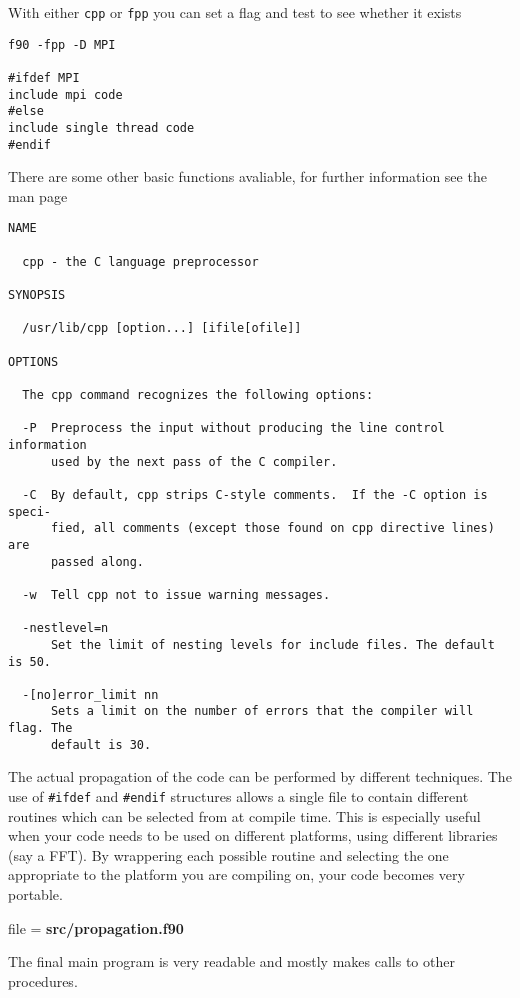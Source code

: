\documentclass[12pt,a4paper,oneside,openany]{report}
\newcommand{\fcode}[1]{\par \small file = \textbf{#1}  \normalsize}
\newcommand{\code}[1]{\texttt{#1}}
\begin{document}
With either \code{cpp} or \code{fpp} you can set a flag and test to see whether it exists

\begin{verbatim}
f90 -fpp -D MPI

#ifdef MPI
include mpi code
#else
include single thread code
#endif
\end{verbatim}

\newpage

There are some other basic functions avaliable, for further information see the man page

\begin{verbatim}
NAME

  cpp - the C language preprocessor

SYNOPSIS

  /usr/lib/cpp [option...] [ifile[ofile]]

OPTIONS

  The cpp command recognizes the following options:

  -P  Preprocess the input without producing the line control information
      used by the next pass of the C compiler.

  -C  By default, cpp strips C-style comments.  If the -C option is speci-
      fied, all comments (except those found on cpp directive lines) are
      passed along.

  -w  Tell cpp not to issue warning messages.

  -nestlevel=n
      Set the limit of nesting levels for include files. The default is 50.

  -[no]error_limit nn
      Sets a limit on the number of errors that the compiler will flag. The
      default is 30.
\end{verbatim}

\newpage

The actual propagation of the code can be performed by different techniques.  The use of \code{\#ifdef} and \code{\#endif} structures allows a single file to contain different routines which can be selected from at compile time.  This is especially useful when your code needs to be used on different platforms, using different libraries (say a FFT).  By wrappering each possible routine and selecting the one appropriate to the platform you are compiling on, your code becomes very portable.

\fcode{src/propagation.f90}

\newpage

The final main program is very readable and mostly makes calls to other procedures.
\end{document}
